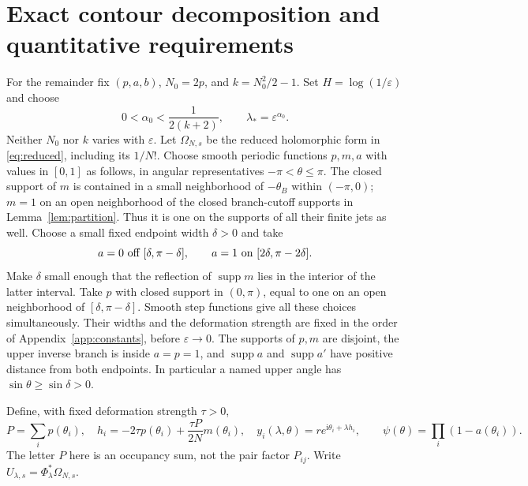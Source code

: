 \documentclass[11pt]{article}
\numberwithin{equation}{section}
\theoremstyle{definition}
\newcommand{\ii}{\mathrm i}
\newcommand{\eps}{\varepsilon}
\begin{document}


\section{Exact contour decomposition and quantitative requirements}
\label{sec:tailreduction}
For the remainder fix \((p,a,b)\), \(N_0=2p\), and \(k=N_0^2/2-1\).
Set \(H=\log(1/\eps)\) and choose
\begin{equation}
 0<\alpha_0<\frac1{2(k+2)},\qquad \lambda_*=\eps^{\alpha_0}.
 \label{eq:alphachoice}
\end{equation}
Neither \(N_0\) nor \(k\) varies with \(\eps\).
Let \(\Omega_{N,s}\) be the reduced holomorphic form in
\eqref{eq:reduced}, including its \(1/N!\).
Choose smooth periodic functions \(p,m,a\) with values in \([0,1]\)
as follows, in angular representatives \(-\pi<\theta\le\pi\).
The closed support of \(m\) is contained in a small neighborhood of
\(-\theta_B\) within \((-\pi,0)\); \(m=1\) on an open neighborhood
of the closed branch-cutoff supports in Lemma~\ref{lem:partition}.
Thus it is one on the supports of all their finite jets as well.
Choose a small fixed endpoint width \(\delta>0\) and take
\[
 a=0\ \hbox{off }[\delta,\pi-\delta],\qquad
 a=1\ \hbox{on }[2\delta,\pi-2\delta].
\]
Make \(\delta\) small enough that the reflection of
\(\operatorname{supp}m\) lies in the interior of the latter interval.
Take \(p\) with closed support in \((0,\pi)\), equal to one on
an open neighborhood of \([\delta,\pi-\delta]\).
Smooth step functions give all these choices simultaneously.
Their widths and the deformation strength are fixed in the order
of Appendix~\ref{app:constants}, before \(\eps\to0\).
The supports of \(p,m\) are disjoint, the upper inverse branch is
inside \(a=p=1\), and \(\operatorname{supp}a\) and
\(\operatorname{supp}a'\) have positive distance from both endpoints.
In particular a named upper angle has \(\sin\theta\ge\sin\delta>0\).

Define, with fixed deformation strength \(\tau>0\),
\[
 P=\sum_i p(\theta_i),\quad
 h_i=-2\tau p(\theta_i)+\frac{\tau P}{2N}m(\theta_i),\quad
 y_i(\lambda,\theta)=r e^{\ii\theta_i+\lambda h_i},
 \qquad \psi(\theta)=\prod_i(1-a(\theta_i)).
\]
The letter \(P\) here is an occupancy sum, not the pair factor \(P_{ij}\).
Write \(U_{\lambda,s}=\Phi_\lambda^*\Omega_{N,s}\).
\end{document}
